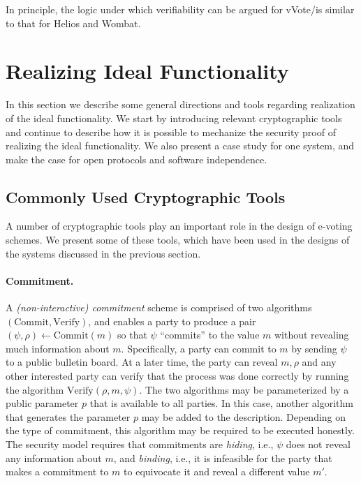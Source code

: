 In principle, the logic under which verifiability can be argued for
vVote/\PaV is similar to that for Helios and Wombat.

\section{Realizing Ideal Functionality}

In this section we describe some general directions and tools
regarding realization of the ideal functionality. We start by
introducing relevant cryptographic tools and continue to describe how
it is possible to mechanize the security proof of realizing the ideal
functionality. We also present a case study for one system, and make
the case for open protocols and software independence.

\subsection{Commonly Used Cryptographic Tools}

A number of cryptographic tools play an important role in the design
of e-voting schemes. We present some of these tools, which have been
used in the designs of the systems discussed in the previous section.

\paragraph{Commitment.} A \emph{(non-interactive) commitment}
  scheme is comprised of two algorithms
$(\mathrm{Commit}, \mathrm{Verify})$, and enables a party to produce a
pair $(\psi, \rho) \leftarrow \mathrm{Commit}(m)$ so that $\psi$
``commits'' to the value $m$ without revealing much information about
$m$. Specifically, a party can commit to $m$ by sending $\psi$ to a
public bulletin board. At a later time, the party can reveal $m,\rho$
and any other interested party can verify that the process was done
correctly by running the algorithm $\mathrm{Verify}(\rho, m, \psi)$.
The two algorithms may be parameterized by a public parameter $p$ that
is available to all parties. In this case, another algorithm that
generates the parameter $p$ may be added to the description. Depending
on the type of commitment, this algorithm may be required to be
executed honestly. The security model requires that commitments are
\emph{hiding}, i.e., $\psi$ does not reveal any information about $m$,
and \emph{binding}, i.e., it is infeasible for the party that makes a
commitment to $m$ to equivocate it and reveal a different value $m'$.

